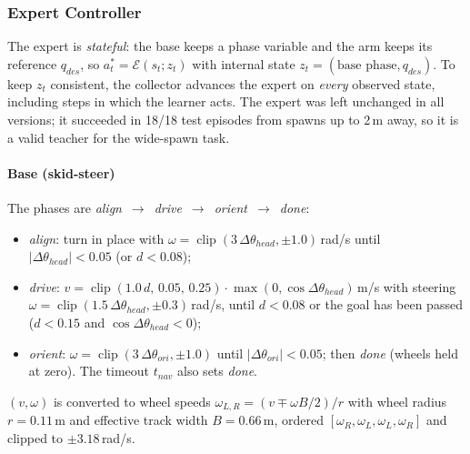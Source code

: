 \documentclass[conference]{IEEEtran}
\newcommand{\dagE}{\mathcal{E}}                        %
\begin{document}
\subsubsection{Expert Controller}
\label{dag:expert}

The expert is \emph{stateful}: the base keeps a phase variable and the arm keeps its reference $q_{des}$, so $a_t^{*}=\dagE(s_t;z_t)$ with internal state $z_t=(\text{base phase},q_{des})$. To keep $z_t$ consistent, the collector advances the expert on \emph{every} observed state, including steps in which the learner acts. The expert was left unchanged in all versions; it succeeded in 18/18 test episodes from spawns up to 2\,m away, so it is a valid teacher for the wide-spawn task.

\paragraph{Base (skid-steer)} The phases are \emph{align}~$\to$~\emph{drive}~$\to$~\emph{orient}~$\to$~\emph{done}:
\begin{itemize}
  \item \emph{align}: turn in place with $\omega=\operatorname{clip}(3\,\Delta\theta_{head},\pm1.0)$\,rad/s until $|\Delta\theta_{head}|<0.05$ (or $d<0.08$);
  \item \emph{drive}: $v=\operatorname{clip}(1.0\,d,\,0.05,\,0.25)\cdot\max(0,\cos\Delta\theta_{head})$\,m/s with steering $\omega=\operatorname{clip}(1.5\,\Delta\theta_{head},\pm0.3)$\,rad/s, until $d<0.08$ or the goal has been passed ($d<0.15$ and $\cos\Delta\theta_{head}<0$);
  \item \emph{orient}: $\omega=\operatorname{clip}(3\,\Delta\theta_{ori},\pm1.0)$ until $|\Delta\theta_{ori}|<0.05$; then \emph{done} (wheels held at zero). The timeout $t_{nav}$ also sets \emph{done}.
\end{itemize}
$(v,\omega)$ is converted to wheel speeds $\omega_{L,R}=(v\mp\omega B/2)/r$ with wheel radius $r=0.11$\,m and effective track width $B=0.66$\,m, ordered $[\omega_R,\omega_L,\omega_L,\omega_R]$ and clipped to $\pm3.18$\,rad/s.
\end{document}
